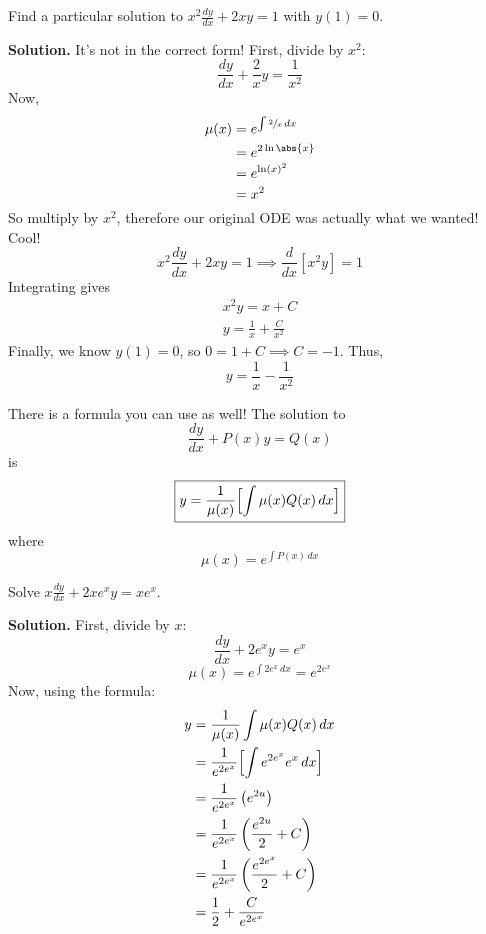 \begin{Example}{}{}
    Find a particular solution to
    $ \displaystyle  x^2 \frac{dy}{dx} +2xy=1 $
    with $ y(1)=0 $.

    \textbf{Solution.} It's not in the correct form! First, divide by $ x^2 $:
    \[ \frac{dy}{dx} +\frac{2}{x} y=\frac{1}{x^2}  \]
    Now,
    \begin{align*}
        \mu(x)
         & =e^{\int \sfrac{2}{x} \, d{x} } \\
         & =e^{2\ln\abs{x}}                \\
         & =e^{\ln(x)^2}                   \\
         & =x^2
    \end{align*}
    So multiply by $ x^2 $, therefore our original ODE was actually what we wanted! Cool!
    \[ x^2 \frac{dy}{dx} +2xy=1
        \implies\frac{d}{dx} \left[ x^2y \right]=1 \]
    Integrating gives
    \begin{align*}
        x^2 y=x+C \\
        y=\frac{1}{x} +\frac{C}{x^2}
    \end{align*}
    Finally, we know $ y(1)=0 $, so $ 0=1+C\implies C=-1 $. Thus,
    \[ y=\frac{1}{x} -\frac{1}{x^2} \]
\end{Example}

\begin{Remark}{}{}
    There is a formula you can use as well! The solution to
    \[ \frac{dy}{dx}+P(x)y=Q(x) \]
    is
    \[ \boxed{y=\frac{1}{\mu(x)}\Bigl[\int \mu(x)Q(x)\, d{x} \Bigr]}  \]
    where
    \[ \mu(x)=e^{\int P(x)\, d{x}} \]
\end{Remark}

\begin{Example}{}{}
    Solve $ \displaystyle  x \frac{dy}{dx} +2xe^x y=xe^x $.

    \textbf{Solution.}
    First, divide by $ x $:
    \[ \frac{dy}{dx}+2e^x y=e^x \]
    \[ \mu(x)=e^{\int 2e^x\, d{x}}=e^{2e^x} \]
    Now, using the formula:
    \begin{align*}
        y
         & =\frac{1}{\mu(x)}\int \mu(x)Q(x)\, d{x}                 \\
         & =\frac{1}{e^{2e^x}}\Bigl[\int e^{2e^x}e^x\, d{x} \Bigr] \\
         & =\frac{1}{e^{2e^x}} \left(e^{2u}\right)                 \\
         & =\frac{1}{e^{2e^x}}\left( \frac{e^{2u}}{2} +C \right)   \\
         & =\frac{1}{e^{2e^x}}\left( \frac{e^{2e^x}}{2} +C \right) \\
         & =\frac{1}{2} +\frac{C}{e^{2e^x}}
    \end{align*}
\end{Example}

